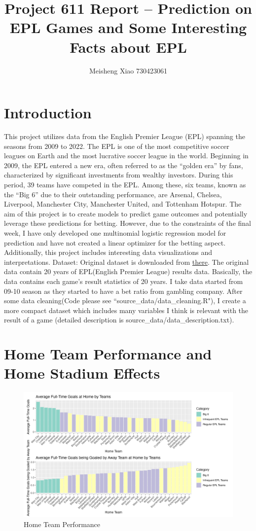 \documentclass{article}
\title{Project 611 Report -- Prediction on EPL Games and Some Interesting Facts about EPL}
\author{Meisheng Xiao 730423061}
\begin{document}
\date{}
\maketitle


\section{Introduction}
This project utilizes data from the English Premier League (EPL) spanning the seasons from 2009 to 2022. The EPL is one of the most competitive soccer leagues on Earth and the most lucrative soccer league in the world. Beginning in 2009, the EPL entered a new era, often referred to as the “golden era” by fans, characterized by significant investments from wealthy investors. During this period, 39 teams have competed in the EPL. Among these, six teams, known as the “Big 6” due to their outstanding performance, are Arsenal, Chelsea, Liverpool, Manchester City, Manchester United, and Tottenham Hotspur.
The aim of this project is to create models to predict game outcomes and potentially leverage these predictions for betting. However, due to the constraints of the final week, I have only developed one multinomial logistic regression model for prediction and have not created a linear optimizer for the betting aspect. Additionally, this project includes interesting data visualizations and interpretations.
Dataset: Original dataset is downloaded from \href{https://www.kaggle.com/datasets/saife245/english-premier-league}{there}. The original data contain 20 years of EPL(English Premier League) results data. Basically, the data contains each game’s result statistics of 20 years. I take data started from 09-10 season as they started to have a bet ratio from gambling company. After some data cleaning(Code please see “source\_data/data\_cleaning.R"), I create a more compact dataset which includes many variables I think is relevant with the result of a game (detailed description is source\_data/data\_description.txt).

\section{Home Team Performance and Home Stadium Effects}

\begin{figure}[h!]
\centering
\includegraphics[width=\textwidth]{HomeTeam_performance.png}
\caption{\label{fig:htp}Home Team Performance}
\end{figure}
\end{document}
